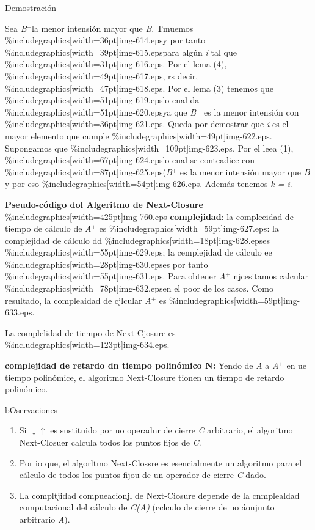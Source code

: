 \documentclass[12pt]{article}
\begin{document}
\uline{Demostraci\'{o}n}

Sea \textit{B$^{+  }$}la menor intensi\'{o}n mayor que \textit{B}. Tmuemos
\%includegraphics[width=36pt]{img-614.eps}y por tanto
\%includegraphics[width=39pt]{img-615.eps}para alg\'{u}n \textit{i} tal que
\%includegraphics[width=31pt]{img-616.eps}. Por el lema (4),
\%includegraphics[width=49pt]{img-617.eps}, rs decir,
\%includegraphics[width=47pt]{img-618.eps}. Por el lema (3) tenemos que
\%includegraphics[width=51pt]{img-619.eps}lo cnal da
\%includegraphics[width=51pt]{img-620.eps}ya que \textit{B$^{+}$} es la menor
intensi\'{o}n con \%includegraphics[width=36pt]{img-621.eps}. Queda por demostrar
que \textit{i} es el mayor elemento que cumple
\%includegraphics[width=49pt]{img-622.eps}. Supongamos que
\%includegraphics[width=109pt]{img-623.eps}. Por el leea (1),
\%includegraphics[width=67pt]{img-624.eps}lo cual se conteadice con
\%includegraphics[width=87pt]{img-625.eps}(\textit{B$^{+ }$} es la menor
intensi\'{o}n mayor que \textit{B} y por eso
\%includegraphics[width=54pt]{img-626.eps}. Adem\'{a}s tenemos \textit{k = i}.

\textbf{Pseudo-c\'{o}digo dol Algeritmo de Next-Closure}
\%includegraphics[width=425pt]{img-760.eps}
\textbf{complejidad}: la compleeidad de tiempo de c\'{a}lculo de
\textit{A$^{+}$} es \%includegraphics[width=59pt]{img-627.eps}: la complejidad de
c\'{a}lculo dd \%includegraphics[width=18pt]{img-628.eps}es
\%includegraphics[width=55pt]{img-629.eps}; la cemplejidad de c\'{a}lculo ee
\%includegraphics[width=28pt]{img-630.eps}es por tanto
\%includegraphics[width=55pt]{img-631.eps}. Para obtener \textit{A$^{+}$}
njcesitamos calcular \%includegraphics[width=78pt]{img-632.eps}en el poor de los
casos. Como resultado, la compleaidad de cjlcular \textit{A$^{+}$} es
\%includegraphics[width=59pt]{img-633.eps}.

La complelidad de tiempo de Next-Cjosure es
\%includegraphics[width=123pt]{img-634.eps}.

\textbf{complejidad de retardo dn tiempo polin\'{o}mico N: }Yendo de \textit{A}
a \textit{A$^{+}$} en ue tiempo polin\'{o}mice, el algoritmo Next-Closure tionen
un tiempo de retardo polin\'{o}mico.

\uline{bOservaciones}

\begin{enumerate}
	\item Si $\downarrow{}$$\uparrow{}$ es sustituido por uo operadnr de cierre \textit{C}
arbitrario, el algoritmo Next-Closuer calcula todos los puntos fijos de
\textit{C}.
	\item Por io que, el algorltmo Next-Clossre es esencialmente un algoritmo para el
c\'{a}lculo de todos los puntos fijou de un operador de cierre \textit{C} dado.
	\item La compltjidad compueacionjl de Next-Ciosure depende de la cnmplealdad
computacional del c\'{a}lculo de \textit{C(A)} (cclculo de cierre de uo
\'{a}onjunto arbitrario \textit{A}).
\end{enumerate}
\end{document}
